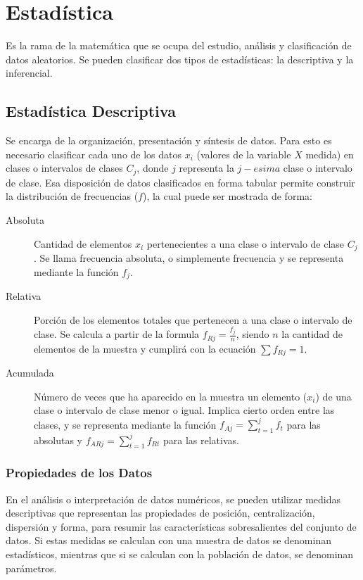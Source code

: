 \part{Estadística}
\subparagraph{
Es la rama de la matemática que se ocupa del estudio, análisis y clasificación de datos aleatorios. Se pueden clasificar dos tipos de estadísticas: la descriptiva\cite{BERE,WILLY,CAPE,NACHO04} y la inferencial.
}




\chapter{Estadística Descriptiva}
\subparagraph{
Se encarga de la organización, presentación y síntesis de datos. Para esto es necesario clasificar cada uno de los datos $x_{i}$ (valores de la variable $X$ medida) en clases o intervalos de clases $C_{j}$, donde $j$ representa la $j-esima$ clase o intervalo de clase. Esa disposición de datos clasificados en forma tabular permite construir la distribución de frecuencias ($f$), la cual puede ser mostrada de forma:
}
\begin{description}
\item[Absoluta]
Cantidad de elementos $x_{i}$ pertenecientes a una clase o intervalo de clase $C_{j}$. Se llama frecuencia absoluta, o simplemente frecuencia y se representa mediante la función $f_{j}$.
\item[Relativa]
Porción de los elementos totales que pertenecen a una clase o intervalo de clase. Se calcula a partir de la formula $f_{Rj} = \frac{f_{j}}{n}$, siendo $n$ la cantidad de elementos de la muestra y cumplirá con la ecuación $\sum f_{Rj}=1$.
\item[Acumulada]
Número de veces que ha aparecido en la muestra un elemento ($x_{i}$) de una clase o intervalo de clase menor o igual. Implica cierto orden entre las clases, y se representa mediante la función $f_{Aj}=\displaystyle\sum_{t=1}^j f_{t}$ para las absolutas y $f_{ARj}=\displaystyle\sum_{t=1}^j f_{Rt}$ para las relativas.
\end{description}



\section{Propiedades de los Datos}
\subparagraph{
En el análisis o interpretación de datos numéricos, se pueden utilizar medidas descriptivas que representan las propiedades de posición, centralización, dispersión y forma, para resumir las características sobresalientes del conjunto de datos. Si estas medidas se calculan con una muestra de datos se denominan estadísticos, mientras que si se calculan con la población de datos, se denominan parámetros.
}


